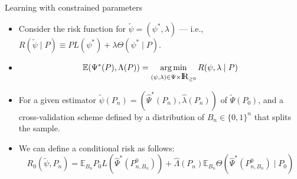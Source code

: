 \documentclass[12pt,t]{beamer}
\newcommand{\E}{\mathbb{E}}
\DeclareMathOperator*{\argmin}{arg\,min}
\newcommand{\openr}{\hbox{${\rm I\kern-.2em R}$}}
\begin{document}
\begin{frame}[c]{Learning with constrained parameters}

\begin{center}
\begin{itemize}
  \itemsep12pt
  \item Consider the risk function for $\widetilde{\psi} = (\psi^*, \lambda)$
    --- i.e., $R(\tilde{\psi} \mid P) \equiv PL(\psi^*) + \lambda \Theta(\psi^*
    \mid P)$.
  \item $$\E(\Psi^*(P), \Lambda(P)) = \argmin_{(\psi, \lambda) \in \Psi
      \times \openr_{\geq 0}}R(\psi, \lambda \mid P)$$
  \item For a given estimator $\widetilde{\psi}(P_n) = (\hat{\Psi}^*(P_n),
    \hat{\lambda}(P_n))$ of $\widetilde{\Psi}(P_0)$, and a cross-validation
    scheme defined by a distribution of $B_n \in \{0, 1\}^n$ that splits the
    sample.
  \item We can define a conditional risk as follows:
    $$R_0(\widetilde{\psi}, P_n) = \E_{B_n} P_0L(\hat{\Psi}^*(P_{n, B_n}^0)) +
      \hat{\Lambda}(P_n) \E_{B_n} \Theta(\hat{\Psi}^*(P_{n, B_n}^0) \mid P_0)$$
\end{itemize}
\end{center}


\end{frame}

\end{document}

